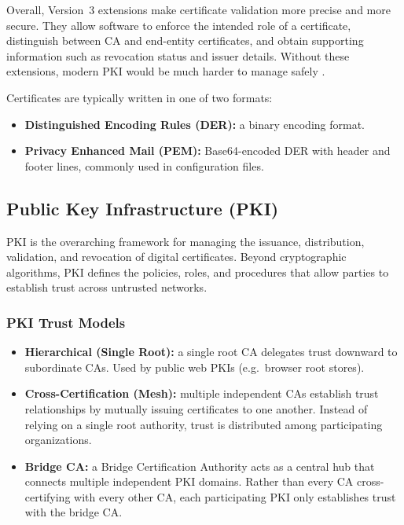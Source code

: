 \documentclass[10pt,twocolumn]{article}
\begin{document}
Overall, Version~3 extensions make certificate validation more precise and
more secure. They allow software to enforce the intended role of a
certificate, distinguish between CA and end-entity certificates, and obtain
supporting information such as revocation status and issuer details. Without
these extensions, modern PKI would be much harder to manage safely
\cite{rfc5280}.

Certificates are typically written in one of two formats:
\begin{itemize}
    \item \textbf{Distinguished Encoding Rules (DER):} a binary encoding format.
    \item \textbf{Privacy Enhanced Mail (PEM):} Base64-encoded DER with header
          and footer lines, commonly used in configuration files.
\end{itemize}

\subsection{Public Key Infrastructure (PKI)}

PKI is the overarching framework for managing the issuance, distribution,
validation, and revocation of digital certificates. Beyond cryptographic
algorithms, PKI defines the policies, roles, and procedures that allow parties
to establish trust across untrusted networks.

\subsubsection{PKI Trust Models}

\begin{itemize}
  \item \textbf{Hierarchical (Single Root):} a single root CA delegates trust
        downward to subordinate CAs. Used by public web PKIs (e.g.\ browser
        root stores).
  \item \textbf{Cross-Certification (Mesh):} multiple independent CAs establish
        trust relationships by mutually issuing certificates to one another.
        Instead of relying on a single root authority, trust is distributed
        among participating organizations.
  \item \textbf{Bridge CA:} a Bridge Certification Authority acts as a central
        hub that connects multiple independent PKI domains. Rather than every
        CA cross-certifying with every other CA, each participating PKI only
        establishes trust with the bridge CA.
\end{itemize}
\end{document}
